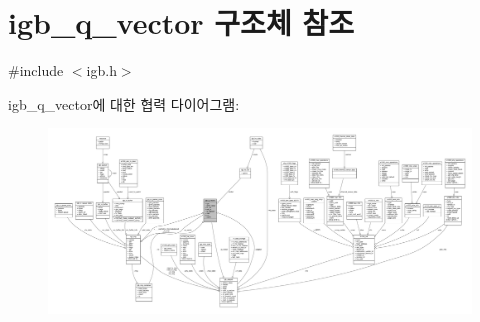 \hypertarget{structigb__q__vector}{}\section{igb\+\_\+q\+\_\+vector 구조체 참조}
\label{structigb__q__vector}


{\ttfamily \#include $<$igb.\+h$>$}



igb\+\_\+q\+\_\+vector에 대한 협력 다이어그램\+:
\nopagebreak
\begin{figure}[H]
\begin{center}
\leavevmode
\includegraphics[width=350pt]{structigb__q__vector__coll__graph}
\end{center}
\end{figure}
